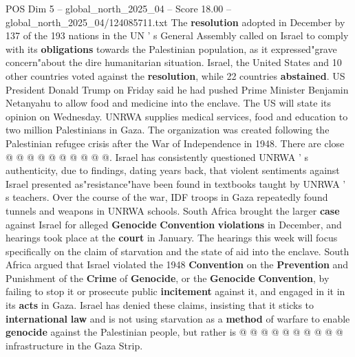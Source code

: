 \begin{textsample}{POS Dim 5 – global\_north\_2025\_04 – Score 18.00 – global\_north\_2025\_04/124085711.txt}
The \textbf{resolution} adopted in December by 137 of the 193 nations in the UN ' s General Assembly called on Israel to comply with its \textbf{obligations} towards the Palestinian population, as it expressed"grave concern"about the dire humanitarian situation.
Israel, the United States and 10 other countries voted against the \textbf{resolution}, while 22 countries \textbf{abstained}.
US President Donald Trump on Friday said he had pushed Prime Minister Benjamin Netanyahu to allow food and medicine into the enclave.
The US will state its opinion on Wednesday.
UNRWA supplies medical services, food and education to two million Palestinians in Gaza.
The organization was created following the Palestinian refugee crisis after the War of Independence in 1948.
There are close @ @ @ @ @ @ @ @ @ @.
Israel has consistently questioned UNRWA ' s authenticity, due to findings, dating years back, that violent sentiments against Israel presented as"resistance"have been found in textbooks taught by UNRWA ' s teachers.
Over the course of the war, IDF troops in Gaza repeatedly found tunnels and weapons in UNRWA schools.
South Africa brought the larger \textbf{case} against Israel for alleged \textbf{Genocide} \textbf{Convention} \textbf{violations} in December, and hearings took place at the \textbf{court} in January.
The hearings this week will focus specifically on the claim of starvation and the state of aid into the enclave.
South Africa argued that Israel violated the 1948 \textbf{Convention} on the \textbf{Prevention} and Punishment of the \textbf{Crime} of \textbf{Genocide}, or the \textbf{Genocide} \textbf{Convention}, by failing to stop it or prosecute public \textbf{incitement} against it, and engaged in it in its \textbf{acts} in Gaza.
Israel has denied these claims, insisting that it sticks to \textbf{international} \textbf{law} and is not using starvation as a \textbf{method} of warfare to enable \textbf{genocide} against the Palestinian people, but rather is @ @ @ @ @ @ @ @ @ @ infrastructure in the Gaza Strip.

\end{textsample}
